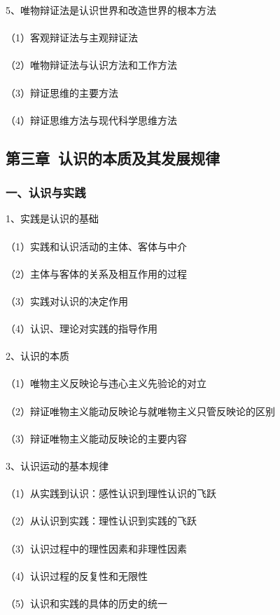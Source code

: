 \documentclass{ctexart}
\begin{document}
5、唯物辩证法是认识世界和改造世界的根本方法
\\\\
（1）客观辩证法与主观辩证法
\\\\
（2）唯物辩证法与认识方法和工作方法
\\\\
（3）辩证思维的主要方法
\\\\
（4）辩证思维方法与现代科学思维方法
\subsection{第三章\ 认识的本质及其发展规律}
\subsubsection{一、认识与实践}
1、实践是认识的基础
\\\\
（1）实践和认识活动的主体、客体与中介
\\\\
（2）主体与客体的关系及相互作用的过程
\\\\
（3）实践对认识的决定作用
\\\\
（4）认识、理论对实践的指导作用
\\\\

2、认识的本质
\\\\
（1）唯物主义反映论与违心主义先验论的对立
\\\\
（2）辩证唯物主义能动反映论与就唯物主义只管反映论的区别
\\\\
（3）辩证唯物主义能动反映论的主要内容
\\\\

3、认识运动的基本规律
\\\\
（1）从实践到认识：感性认识到理性认识的飞跃
\\\\
（2）从认识到实践：理性认识到实践的飞跃
\\\\
（3）认识过程中的理性因素和非理性因素
\\\\
（4）认识过程的反复性和无限性
\\\\
（5）认识和实践的具体的历史的统一
\end{document}
